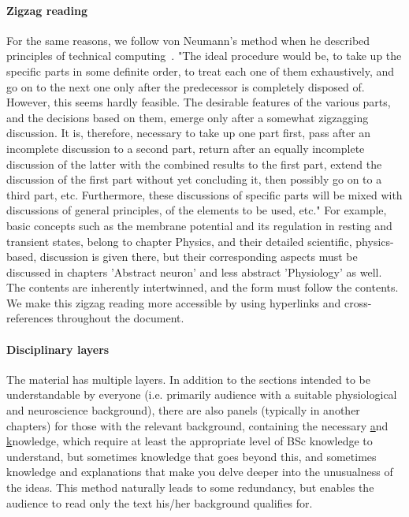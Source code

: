 \paragraph*{Zigzag reading}
For the same reasons, we follow von Neumann's method when he described principles of technical computing~\cite{EDVACreport1945}. "The ideal procedure would be, to take up the specific parts in some definite order, to treat
each one of them exhaustively, and go on to the next one only after the predecessor is completely
disposed of. However, this seems hardly feasible. The desirable features of the various parts, and
the decisions based on them, emerge only after a somewhat \hypertarget{zigzagdiscussion}
{zigzagging discussion}. It is, therefore,
necessary to take up one part first, pass after an incomplete discussion to a second part, return after
an equally incomplete discussion of the latter with the combined results to the first part, extend
the discussion of the first part without yet concluding it, then possibly go on to a third part, etc.
Furthermore, these discussions of specific parts will be mixed with discussions of general principles, of the elements to be used, etc."
For example, basic concepts such as the membrane potential and its regulation in resting and transient states, belong to chapter Physics,
and their detailed scientific, physics-based, discussion is given there, 
but their corresponding aspects must be discussed in chapters 'Abstract neuron' and less abstract 'Physiology' as well.
The contents are inherently intertwinned, and the form must follow the contents.
We make this zigzag reading more accessible by using hyperlinks and cross-references throughout the document. 

\paragraph*{Disciplinary layers}
The material has multiple layers. In addition to the sections intended to be understandable by everyone (i.e. primarily audience with a suitable physiological and neuroscience background), there are also panels (typically in another chapters) for those with the relevant background, containing the necessary \hyperlink{Mathematical panel~\ref{intro:MyMathematicsPanel}} and \hyperlink{Physical panel~\ref{intro:MyPhysicsPanel}} knowledge, which require at least the appropriate level of BSc knowledge to understand, but sometimes knowledge that goes beyond this, and sometimes
knowledge and explanations that make you delve deeper into the unusualness of the ideas. This method naturally leads
to some redundancy, but enables the audience to read only
the text his/her background qualifies for.


